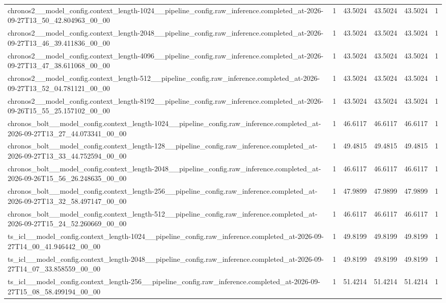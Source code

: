 \begin{tabular}{llllll}
chronos2\_\_model\_config.context\_length-1024\_\_pipeline\_config.raw\_inference.completed\_at-2026-09-27T13\_50\_42.804963\_00\_00 & 1 & 43.5024 & 43.5024 & 43.5024 & 1 \\
chronos2\_\_model\_config.context\_length-2048\_\_pipeline\_config.raw\_inference.completed\_at-2026-09-27T13\_46\_39.411836\_00\_00 & 1 & 43.5024 & 43.5024 & 43.5024 & 1 \\
chronos2\_\_model\_config.context\_length-4096\_\_pipeline\_config.raw\_inference.completed\_at-2026-09-27T13\_47\_38.611068\_00\_00 & 1 & 43.5024 & 43.5024 & 43.5024 & 1 \\
chronos2\_\_model\_config.context\_length-512\_\_pipeline\_config.raw\_inference.completed\_at-2026-09-27T13\_52\_04.781121\_00\_00 & 1 & 43.5024 & 43.5024 & 43.5024 & 1 \\
chronos2\_\_model\_config.context\_length-8192\_\_pipeline\_config.raw\_inference.completed\_at-2026-09-26T15\_55\_25.157102\_00\_00 & 1 & 43.5024 & 43.5024 & 43.5024 & 1 \\
chronos\_bolt\_\_model\_config.context\_length-1024\_\_pipeline\_config.raw\_inference.completed\_at-2026-09-27T13\_27\_44.073341\_00\_00 & 1 & 46.6117 & 46.6117 & 46.6117 & 1 \\
chronos\_bolt\_\_model\_config.context\_length-128\_\_pipeline\_config.raw\_inference.completed\_at-2026-09-27T13\_33\_44.752594\_00\_00 & 1 & 49.4815 & 49.4815 & 49.4815 & 1 \\
chronos\_bolt\_\_model\_config.context\_length-2048\_\_pipeline\_config.raw\_inference.completed\_at-2026-09-26T15\_56\_26.248635\_00\_00 & 1 & 46.6117 & 46.6117 & 46.6117 & 1 \\
chronos\_bolt\_\_model\_config.context\_length-256\_\_pipeline\_config.raw\_inference.completed\_at-2026-09-27T13\_32\_58.497147\_00\_00 & 1 & 47.9899 & 47.9899 & 47.9899 & 1 \\
chronos\_bolt\_\_model\_config.context\_length-512\_\_pipeline\_config.raw\_inference.completed\_at-2026-09-27T15\_24\_52.260669\_00\_00 & 1 & 46.6117 & 46.6117 & 46.6117 & 1 \\
ts\_icl\_\_model\_config.context\_length-1024\_\_pipeline\_config.raw\_inference.completed\_at-2026-09-27T14\_00\_41.946442\_00\_00 & 1 & 49.8199 & 49.8199 & 49.8199 & 1 \\
ts\_icl\_\_model\_config.context\_length-2048\_\_pipeline\_config.raw\_inference.completed\_at-2026-09-27T14\_07\_33.858559\_00\_00 & 1 & 49.8199 & 49.8199 & 49.8199 & 1 \\
ts\_icl\_\_model\_config.context\_length-256\_\_pipeline\_config.raw\_inference.completed\_at-2026-09-27T15\_08\_58.499194\_00\_00 & 1 & 51.4214 & 51.4214 & 51.4214 & 1 \\

\end{tabular}
